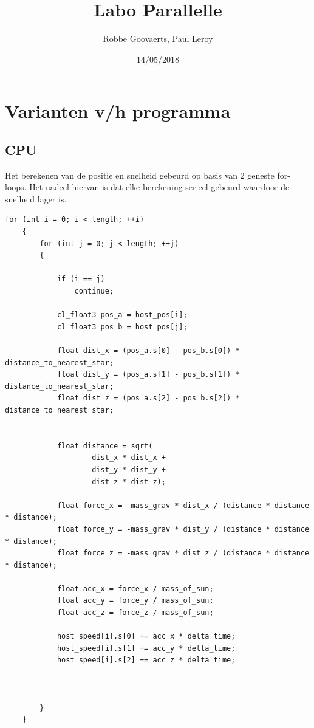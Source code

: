 \documentclass[11pt,a4paper]{article}
\title{Labo Parallelle}
\author{Robbe Goovaerts, Paul Leroy}
\date{14/05/2018}
\begin{document}
    \maketitle

    \section{Varianten v/h programma}
    	\subsection{CPU}
    	Het berekenen van de positie en snelheid gebeurd op basis van 2 geneste for-loops. Het nadeel hiervan is dat elke berekening serieel gebeurd waardoor de snelheid lager is.
    	
    	\begin{lstlisting}[style=CStyle]
	for (int i = 0; i < length; ++i)
    {
        for (int j = 0; j < length; ++j)
        {

            if (i == j)
                continue;

            cl_float3 pos_a = host_pos[i];
            cl_float3 pos_b = host_pos[j];

            float dist_x = (pos_a.s[0] - pos_b.s[0]) * distance_to_nearest_star;
            float dist_y = (pos_a.s[1] - pos_b.s[1]) * distance_to_nearest_star;
            float dist_z = (pos_a.s[2] - pos_b.s[2]) * distance_to_nearest_star;


            float distance = sqrt(
                    dist_x * dist_x +
                    dist_y * dist_y +
                    dist_z * dist_z);

            float force_x = -mass_grav * dist_x / (distance * distance * distance);
            float force_y = -mass_grav * dist_y / (distance * distance * distance);
            float force_z = -mass_grav * dist_z / (distance * distance * distance);

            float acc_x = force_x / mass_of_sun;
            float acc_y = force_y / mass_of_sun;
            float acc_z = force_z / mass_of_sun;

            host_speed[i].s[0] += acc_x * delta_time;
            host_speed[i].s[1] += acc_y * delta_time;
            host_speed[i].s[2] += acc_z * delta_time;



        }
    }
		\end{lstlisting}
\end{document}

